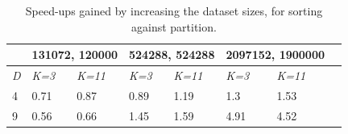 \begin{table}[H]
\centering
\begin{tabular}{@{} *8l @{}}    \toprule
\emph{} &  \multicolumn{2}{c}{ 131072, 120000 } &  \multicolumn{2}{c}{ 524288, 524288 } &  \multicolumn{2}{c}{ 2097152, 1900000 } &  \\\midrule
\emph{D} & \emph{K=3} & \emph{K=11} & \emph{K=3} & \emph{K=11} & \emph{K=3} & \emph{K=11} &  \\\midrule
  4  & 0.71 & 0.87 & 0.89 & 1.19 & 1.3 &1.53  &   \\ 
  9  & 0.56 & 0.66 & 1.45 & 1.59 & 4.91 & 4.52  &   \\\bottomrule 
 \hline
\end{tabular}
\caption{Speed-ups gained by increasing the dataset sizes, for sorting against partition.}
\label{tab:sort}
\end{table}
 




